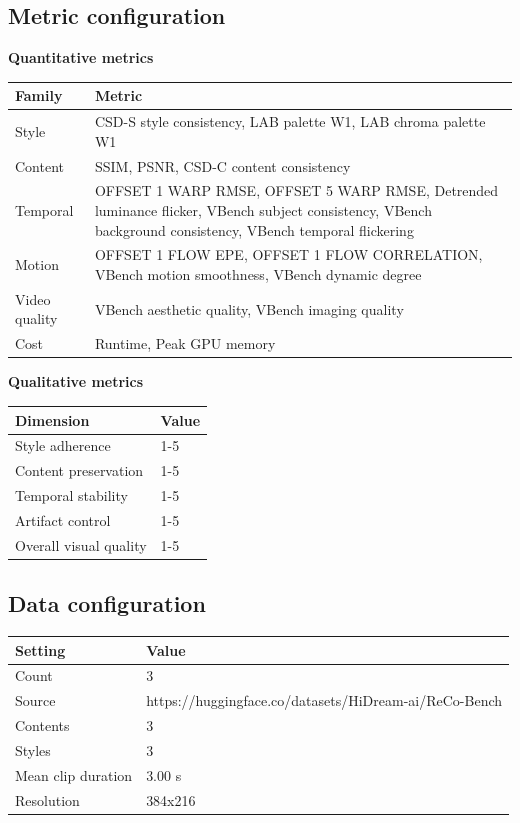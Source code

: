 \documentclass[10pt]{article}
\begin{document}
\subsection*{Metric configuration}
\noindent\textbf{Quantitative metrics}
\begin{tabular}{@{}ll@{}}
\toprule
Family & Metric \\
\midrule
Style & CSD-S style consistency, LAB palette W1, LAB chroma palette W1 \\
Content & SSIM, PSNR, CSD-C content consistency \\
Temporal & OFFSET 1 WARP RMSE, OFFSET 5 WARP RMSE, Detrended luminance flicker, VBench subject consistency, VBench background consistency, VBench temporal flickering \\
Motion & OFFSET 1 FLOW EPE, OFFSET 1 FLOW CORRELATION, VBench motion smoothness, VBench dynamic degree \\
Video quality & VBench aesthetic quality, VBench imaging quality \\
Cost & Runtime, Peak GPU memory \\
\bottomrule
\end{tabular}
\noindent\textbf{Qualitative metrics}
\begin{tabular}{@{}ll@{}}
\toprule
Dimension & Value \\
\midrule
Style adherence & 1-5 \\
Content preservation & 1-5 \\
Temporal stability & 1-5 \\
Artifact control & 1-5 \\
Overall visual quality & 1-5 \\
\bottomrule
\end{tabular}
\subsection*{Data configuration}
\begin{tabular}{@{}ll@{}}
\toprule
Setting & Value \\
\midrule
Count & 3 \\
Source & https://huggingface.co/datasets/HiDream-ai/ReCo-Bench \\
Contents & 3 \\
Styles & 3 \\
Mean clip duration & 3.00 s \\
Resolution & 384x216 \\
\bottomrule
\end{tabular}
\end{document}
